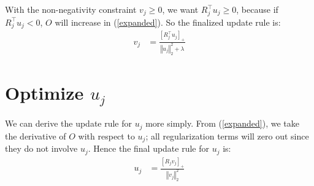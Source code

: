 \documentclass{article}
\begin{document}
With the non-negativity constraint $v_{j} \geq 0$, we want $R^{\top}_j u_{j}  \geq 0$, because if $R^{\top}_j u_{j} < 0$, $O$ will increase in (\ref{expanded}). So the finalized update rule is:
\begin{align}
v_{j} &=\frac{ \left[ R^{\top}_j u_{j} \right]_+}{ \left\Vert u_{j} \right\Vert_2^2 + \lambda}
\end{align}

\section*{Optimize $u_{j}$}
We can derive the update rule for $u_{j}$ more simply.  From (\ref{expanded}), we take the derivative of $O$ with respect to $u_j$; all regularization terms will zero out since they do not involve $u_j$. Hence the final update rule for $u_j$ is:
\begin{align}
u_j&= \frac{\left[ R_j v_j \right]_+ }{\left\Vert v_j \right\Vert_2^2 }
\end{align}
\end{document}
